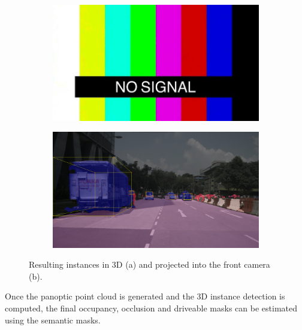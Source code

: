 \begin{figure}[h!]
    \centering
    \begin{subfigure}[b]{0.45\textwidth}
        \includegraphics[width=\textwidth]{images/shared/no_signal.jpg}
        \caption{}
        \label{fig:instance_scene_images_a}
    \end{subfigure}
    \hfill
    \begin{subfigure}[b]{0.45\textwidth}
        \includegraphics[width=\textwidth]{images/methodology/raw_cuboid_1.png}
        \caption{}
        \label{fig:instance_scene_images_b}
    \end{subfigure}

    \caption{Resulting instances in 3D (a) and projected into the front camera (b).}
    \label{fig:instance_scene_images}
\end{figure}


 \label{sec:instance_bev_mask_methodology}
Once the panoptic point cloud is generated and the 3D instance detection is computed, the final occupancy, occlusion and driveable masks can be estimated using the  semantic masks.

